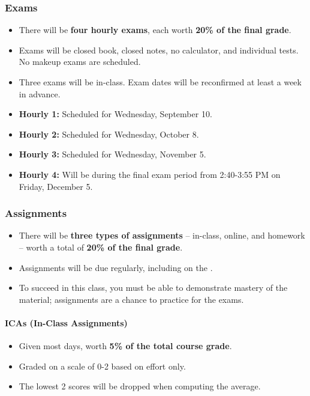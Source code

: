 \subsubsection*{Exams}
\begin{itemize}
    \item There will be \textbf{four hourly exams}, each worth \textbf{20\% of the final grade}.
    \item Exams will be closed book, closed notes, no calculator, and individual tests. No makeup exams are scheduled.
    \item Three exams will be in-class. Exam dates will be reconfirmed at least a week in advance.
    \item \textbf{Hourly 1:} Scheduled for Wednesday, September 10.
    \item \textbf{Hourly 2:} Scheduled for Wednesday, October 8.
    \item \textbf{Hourly 3:} Scheduled for Wednesday, November 5.
    \item \textbf{Hourly 4:} Will be during the final exam period from 2:40-3:55 PM on Friday, December 5.
\end{itemize}

\subsubsection*{Assignments}
\begin{itemize}
    \item There will be \textbf{three types of assignments} -- in-class, online, and homework -- worth a total of \textbf{20\% of the final grade}.
    \item Assignments will be due regularly, including on the .
    \item To succeed in this class, you must be able to demonstrate mastery of the material; assignments are a chance to practice for the exams.
\end{itemize}

\paragraph*{ICAs (In-Class Assignments)}
\begin{itemize}
    \item Given most days, worth \textbf{5\% of the total course grade}.
    \item Graded on a scale of 0-2 based on effort only.
    \item The lowest 2 scores will be dropped when computing the average.
\end{itemize}

